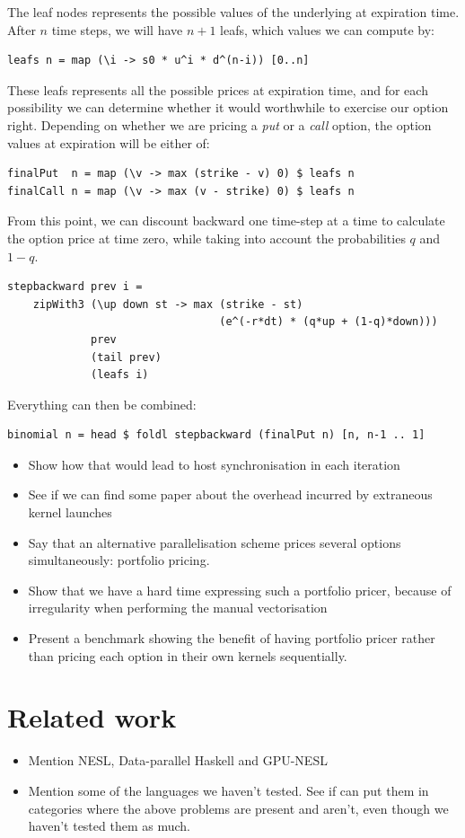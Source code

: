 \documentclass{llncs2e/llncs}
\begin{document}
The leaf nodes represents the possible values of the underlying at
expiration time. After $n$ time steps, we will have $n+1$ leafs, which
values we can compute by:
\begin{verbatim}
leafs n = map (\i -> s0 * u^i * d^(n-i)) [0..n]
\end{verbatim}
These leafs represents all the possible prices at expiration time, and
for each possibility we can determine whether it would worthwhile to
exercise our option right. Depending on whether we are pricing a
\emph{put} or a \emph{call} option, the option values at expiration
will be either of:
\begin{verbatim}
finalPut  n = map (\v -> max (strike - v) 0) $ leafs n
finalCall n = map (\v -> max (v - strike) 0) $ leafs n
\end{verbatim}
From this point, we can discount backward one time-step at a time to
calculate the option price at time zero, while taking into account the
probabilities $q$ and $1-q$.
\begin{verbatim}
stepbackward prev i =
    zipWith3 (\up down st -> max (strike - st) 
                                 (e^(-r*dt) * (q*up + (1-q)*down)))
             prev
             (tail prev)
             (leafs i)
\end{verbatim}
Everything can then be combined:
\begin{verbatim}
binomial n = head $ foldl stepbackward (finalPut n) [n, n-1 .. 1]
\end{verbatim}

\begin{itemize}
\item Show how that would lead to host synchronisation in each iteration
\item See if we can find some paper about the overhead incurred by
  extraneous kernel launches
\item Say that an alternative parallelisation scheme prices several
  options simultaneously: portfolio pricing.
\item Show that we have a hard time expressing such a portfolio
  pricer, because of irregularity when performing the manual
  vectorisation
\item Present a benchmark showing the benefit of having portfolio
  pricer rather than pricing each option in their own kernels
  sequentially.
\end{itemize}

\section{Related work}
\begin{itemize}
\item Mention NESL, Data-parallel Haskell and GPU-NESL
\item Mention some of the languages we haven't tested. See if can put
  them in categories where the above problems are present and aren't,
  even though we haven't tested them as much.
\end{itemize}
\end{document}
